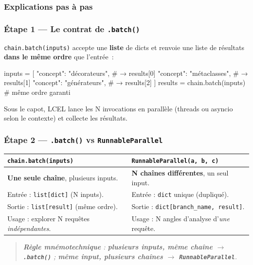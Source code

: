 \documentclass[11pt,a4paper]{article}
\begin{document}
\subsubsection{Explications pas à pas}

\subsubsection*{Étape 1 — Le contrat de \texttt{.batch()}}

\texttt{chain.batch(inputs)} accepte une \textbf{liste} de dicts et
renvoie une liste de résultats \textbf{dans le même ordre} que l'entrée~:

\begin{pythoncode}
inputs = [
    {"concept": "décorateurs"},     # → results[0]
    {"concept": "métaclasses"},     # → results[1]
    {"concept": "générateurs"},     # → results[2]
]
results = chain.batch(inputs)       # même ordre garanti
\end{pythoncode}

Sous le capot, LCEL lance les N invocations en parallèle (threads ou
asyncio selon le contexte) et collecte les résultats.

\subsubsection*{Étape 2 — \texttt{.batch()} vs \texttt{RunnableParallel}}

\begin{center}
\begin{tabular}{p{6.5cm} p{6.5cm}}
\toprule
\textbf{\texttt{chain.batch(inputs)}} & \textbf{\texttt{RunnableParallel(a, b, c)}} \\
\midrule
\textbf{Une seule chaîne}, plusieurs inputs.
& \textbf{N chaînes différentes}, un seul input. \\[1mm]
Entrée : \texttt{list[dict]} (N inputs).
& Entrée : \texttt{dict} unique (dupliqué). \\[1mm]
Sortie : \texttt{list[result]} (même ordre).
& Sortie : \texttt{dict[branch\_name, result]}. \\[1mm]
Usage : explorer N requêtes \emph{indépendantes}.
& Usage : N angles d'analyse d'\emph{une} requête. \\
\bottomrule
\end{tabular}
\end{center}

\begin{quote}\itshape\sloppy
\textbf{Règle mnémotechnique} :
\textbf{plusieurs inputs, même chaîne $\to$ \texttt{.batch()}} ;
\textbf{même input, plusieurs chaînes $\to$ \texttt{RunnableParallel}}.
\end{quote}
\end{document}
